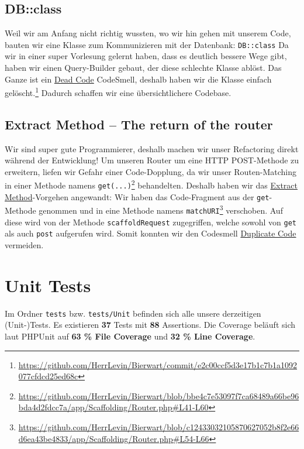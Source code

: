 \documentclass[12pt,a4paper,titlepage,ngerman,pdftex]{report}
\begin{document}
    \subsection{DB::class}\label{subsec:db::class}
    Weil wir am Anfang nicht richtig wussten, wo wir hin gehen mit unserem Code, bauten wir eine Klasse zum Kommunizieren mit der Datenbank: \verb|DB::class|
    Da wir in einer super Vorlesung gelernt haben, dass es deutlich bessere Wege gibt, haben wir einen Query-Builder gebaut, der diese schlechte Klasse ablöst.
    Das Ganze ist ein \href{https://refactoring.guru/smells/dead-code}{Dead Code} CodeSmell, deshalb haben wir die Klasse einfach gelöscht.\footnote{\url{https://github.com/HerrLevin/Bierwart/commit/e2c00ccf5d3e17b1c7b1a1092077cfdcd25ed68c}}
    Dadurch schaffen wir eine übersichtlichere Codebase.
    
    \subsection{Extract Method -- The return of the router}\label{subsec:extract}
    Wir sind super gute Programmierer, deshalb machen wir unser Refactoring direkt während der Entwicklung!
    Um unseren Router um eine HTTP POST-Methode zu erweitern, liefen wir Gefahr einer Code-Dopplung, da wir unser Routen-Matching in einer Methode namens \verb|get(...)|\footnote{\url{https://github.com/HerrLevin/Bierwart/blob/bbe4c7e53097f7ca68489a66be96bda4d2fdcc7a/app/Scaffolding/Router.php\#L41-L60}} behandelten.
    Deshalb haben wir das \href{https://refactoring.guru/extract-method}{Extract Method}-Vorgehen angewandt:
    Wir haben das Code-Fragment aus der \verb|get|-Methode genommen und in eine Methode namens \verb|matchURI|\footnote{\url{https://github.com/HerrLevin/Bierwart/blob/c12433032105870627052b8f2e66d6ea43be4833/app/Scaffolding/Router.php\#L54-L66}} verschoben.
    Auf diese wird von der Methode \verb|scaffoldRequest| zugegriffen, welche sowohl von \verb|get| als auch \verb|post| aufgerufen wird.
    Somit konnten wir den Codesmell \href{https://refactoring.guru/smells/duplicate-code}{Duplicate Code} vermeiden.

    \section{Unit Tests}
    Im Ordner \verb|tests| bzw. \verb|tests/Unit| befinden sich alle unsere derzeitigen (Unit-)Tests.
    Es existieren \textbf{37} Tests mit \textbf{88} Assertions.
    Die Coverage beläuft sich laut PHPUnit auf \textbf{63 \% File Coverage} und \textbf{32 \% Line Coverage}.
\end{document}
